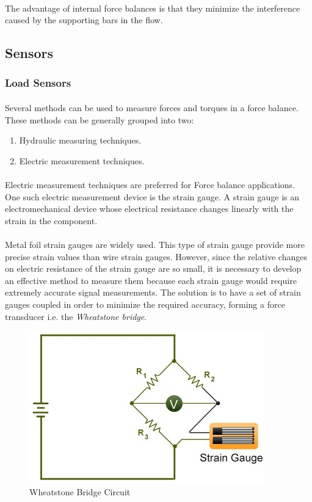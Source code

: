 \paragraph{}The advantage of internal force balances is that they minimize the interference caused by the supporting bars in the flow.
\subsection{Sensors}
\subsubsection{Load Sensors}
\paragraph{}Several methods can be used to measure forces and torques in a force balance. These methods can be generally grouped into two:
\begin{enumerate}
\item Hydraulic measuring techniques.
\item Electric measurement techniques.
\end{enumerate}
\paragraph{}Electric measurement techniques are preferred for Force balance applications. One such electric measurement device is the strain gauge. A strain gauge is an electromechanical device whose electrical resistance changes linearly with the strain in the component.
\paragraph{}Metal foil strain gauges are widely used. This type of strain gauge provide more precise strain values than wire strain gauges. However, since the relative changes on electric resistance of the strain gauge are so small, it is necessary to develop an effective method to measure them because each strain gauge would require extremely accurate signal measurements. The solution is to have a set of strain gauges coupled in order to minimize the required accuracy, forming a force transducer i.e. the \textit{Wheatstone bridge}.
	\begin{figure}[!h]
	\includegraphics{Figures/Fig9}
	\caption{Wheatstone Bridge Circuit}
	\end{figure}
